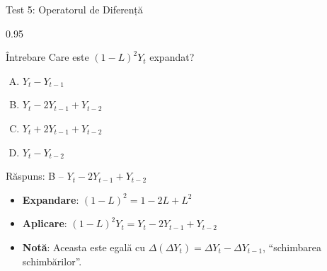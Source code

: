\documentclass[9pt, aspectratio=169, t]{beamer}
\begin{document}
\begin{frame}{Test 5: Operatorul de Diferență}
    \begin{cminipage}{0.95\textwidth}
    \begin{alertblock}{Întrebare}
        Care este $(1-L)^2 Y_t$ expandat?
    \end{alertblock}

    \vspace{0.1cm}

    \begin{enumerate}[A)]\setlength{\itemsep}{0pt}
        \item $Y_t - Y_{t-1}$
        \item $Y_t - 2Y_{t-1} + Y_{t-2}$
        \item $Y_t + 2Y_{t-1} + Y_{t-2}$
        \item $Y_t - Y_{t-2}$
    \end{enumerate}

    \vspace{0.1cm}
    \pause
    \begin{exampleblock}{Răspuns: B -- $Y_t - 2Y_{t-1} + Y_{t-2}$}
        {\small
        \begin{itemize}\setlength{\itemsep}{0pt}
        \item \textbf{Expandare}: $(1-L)^2 = 1 - 2L + L^2$
        \item \textbf{Aplicare}: $(1-L)^2 Y_t = Y_t - 2Y_{t-1} + Y_{t-2}$
        \item \textbf{Notă}: Aceasta este egală cu $\Delta(\Delta Y_t) = \Delta Y_t - \Delta Y_{t-1}$, ``schimbarea schimbărilor''.
        \end{itemize}
        }
    \end{exampleblock}
    \end{cminipage}
\end{frame}
\end{document}
